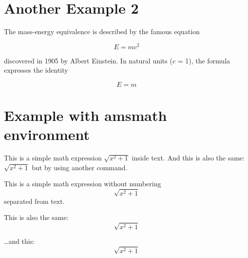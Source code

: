 \documentclass[12pt]{article}
\begin{document}
\section{Another Example 2}

The mass-energy equivalence is described by the famous equation

\[E=mc^2\]

discovered in 1905 by Albert Einstein.
In natural units (\(c\) = 1), the formula expresses the identity

\begin{equation}
    E=m
\end{equation}


\section*{Example with amsmath environment}


This is a simple math expression \(\sqrt{x^2+1}\) inside text.
And this is also the same:
\begin{math}
    \sqrt{x^2+1}
\end{math}
but by using another command.

This is a simple math expression without numbering
\[\sqrt{x^2+1}\]
separated from text.

This is also the same:
\begin{displaymath}
    \sqrt{x^2+1}
\end{displaymath}

\ldots and this:
\begin{equation*}
    \sqrt{x^2+1}
\end{equation*}
\end{document}
